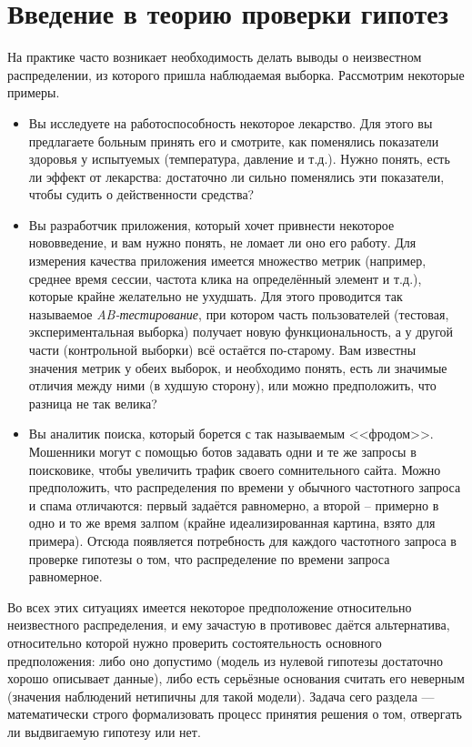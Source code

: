 \section{Введение в теорию проверки гипотез}

На практике часто возникает необходимость делать выводы о неизвестном распределении, из которого пришла наблюдаемая выборка. Рассмотрим некоторые примеры.
\begin{itemize}
    \item Вы исследуете на работоспособность некоторое лекарство. Для этого вы предлагаете больным принять его и смотрите, как поменялись показатели здоровья у испытуемых (температура, давление и т.д.). Нужно понять, есть ли эффект от лекарства: достаточно ли сильно поменялись эти показатели, чтобы судить о действенности средства?
    \item Вы разработчик приложения, который хочет привнести некоторое нововведение, и вам нужно понять, не ломает ли оно его работу. Для измерения качества приложения имеется множество метрик (например, среднее время сессии, частота клика на определённый элемент и т.д.), которые крайне желательно не ухудшать. Для этого проводится так называемое \textit{AB-тестирование}, при котором часть пользователей (тестовая, экспериментальная выборка) получает новую функциональность, а у другой части (контрольной выборки) всё остаётся по-старому. Вам известны значения метрик у обеих выборок, и необходимо понять, есть ли значимые отличия между ними (в худшую сторону), или можно предположить, что разница не так велика?
    \item Вы аналитик поиска, который борется с так называемым <<фродом>>. Мошенники могут с помощью ботов задавать одни и те же запросы в поисковике, чтобы увеличить трафик своего сомнительного сайта. Можно предположить, что распределения по времени у обычного частотного запроса и спама отличаются: первый задаётся равномерно, а второй -- примерно в одно и то же время залпом (крайне идеализированная картина, взято для примера). Отсюда появляется потребность для каждого частотного запроса в проверке гипотезы о том, что распределение по времени запроса равномерное.
\end{itemize}

Во всех этих ситуациях имеется некоторое предположение относительно неизвестного распределения, и ему зачастую в противовес даётся альтернатива, относительно которой нужно проверить состоятельность основного предположения: либо оно допустимо (модель из нулевой гипотезы достаточно хорошо описывает данные), либо есть серьёзные основания считать его неверным (значения наблюдений нетипичны для такой модели). Задача сего раздела --- математически строго формализовать процесс принятия решения о том, отвергать ли выдвигаемую гипотезу или нет.

